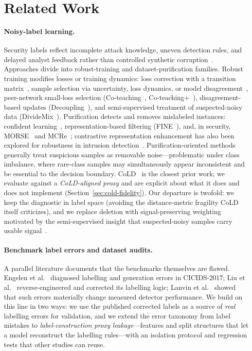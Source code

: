 \documentclass[pdflatex,referee,lineno,sn-basic,Numbered]{sn-jnl}
\begin{document}
\section{Related Work}
\label{sec:related}
\paragraph{Noisy-label learning.}
Security labels reflect incomplete attack knowledge, uneven detection rules,
and delayed analyst feedback rather than controlled synthetic
corruption~\cite{guerra2022datasets,qing2023lowquality}. Approaches divide into
robust-training and dataset-purification families. Robust
training modifies losses or training dynamics: loss correction with a transition
matrix~\cite{patrini2017making,zhao2021enhancing}, sample selection via
uncertainty, loss dynamics, or model disagreement~\cite{xia2021sample,liu2021metric},
peer-network small-loss selection
(Co-teaching~\cite{han2018coteaching}, Co-teaching+~\cite{yu2019coteachingplus}),
disagreement-based updates (Decoupling~\cite{malach2017decoupling}), and
semi-supervised treatment of suspected-noisy data
(DivideMix~\cite{li2020dividemix}). Purification detects and removes mislabeled
instances: confident learning~\cite{northcutt2021confident}, representation-based
filtering (FINE~\cite{kim2021fine}), and, in security, MORSE~\cite{wu2023morse}
and MCRe~\cite{yuan2023mcre}; contrastive representation enhancement has also
been explored for robustness in intrusion
detection~\cite{wang2022feco,yue2022cleid}. Purification-oriented methods
generally treat suspicious samples as removable noise---problematic under class
imbalance, where rare-class samples may simultaneously appear inconsistent and
be essential to the decision boundary. CoLD~\cite{yang2026cold} is the closest prior work;
we evaluate against a \emph{CoLD-aligned proxy} and are explicit about what it
does and does not implement (Section~\ref{sec:cold-fidelity}). Our departure is twofold: we keep the diagnostic in label space
(avoiding the distance-metric fragility CoLD itself criticizes), and we replace
deletion with signal-preserving weighting motivated by the semi-supervised
insight that suspected-noisy samples carry usable signal~\cite{li2020dividemix,wu2023morse}.

\paragraph{Benchmark label errors and dataset audits.}
A parallel literature documents that the benchmarks themselves are flawed.
Engelen et al.~\cite{engelen2021troubleshooting} diagnosed labelling and
generation errors in CICIDS-2017; Liu et al.~\cite{liu2022error} reverse-engineered
and corrected its labelling logic; Lanvin et al.~\cite{lanvin2023errors} showed
that such errors materially change measured detector performance. We build on
this line in two ways: we use the published corrected labels as a source of
\emph{real} labelling errors for validation, and we extend the error taxonomy
from label mistakes to \emph{label-construction proxy leakage}---features and
split structures that let a model reconstruct the labelling rules---with an
isolation protocol and regression tests that other studies can reuse.
\end{document}

